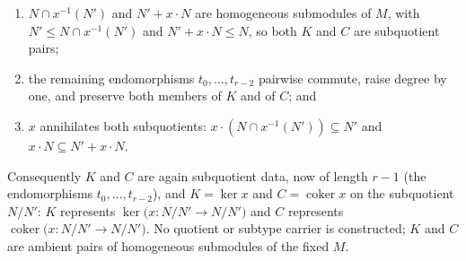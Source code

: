 \begin{lemma}
\begin{enumerate}
    \item \(N \cap x^{-1}(N')\) and \(N' + x \cdot N\) are homogeneous submodules of
      \(M\), with \(N' \le N \cap x^{-1}(N')\) and \(N' + x \cdot N \le N\), so both
      \(K\) and \(C\) are subquotient pairs;
    \item the remaining endomorphisms \(t_0, \dots, t_{r-2}\) pairwise commute,
      raise degree by one, and preserve both members of \(K\) and of \(C\); and
    \item \(x\) annihilates both subquotients: \(x \cdot (N \cap x^{-1}(N')) \subseteq N'\)
      and \(x \cdot N \subseteq N' + x \cdot N\).
  \end{enumerate}
  Consequently \(K\) and \(C\) are again subquotient data, now of length \(r-1\)
  (the endomorphisms \(t_0, \dots, t_{r-2}\)), and \(K = \ker x\) and \(C =
  \operatorname{coker} x\) on the subquotient \(N/N'\): \(K\) represents
  \(\ker\bigl(x : N/N' \to N/N'\bigr)\) and \(C\) represents
  \(\operatorname{coker}\bigl(x : N/N' \to N/N'\bigr)\). No quotient or subtype
  carrier is constructed; \(K\) and \(C\) are ambient pairs of homogeneous
  submodules of the fixed \(M\).
\end{lemma}

